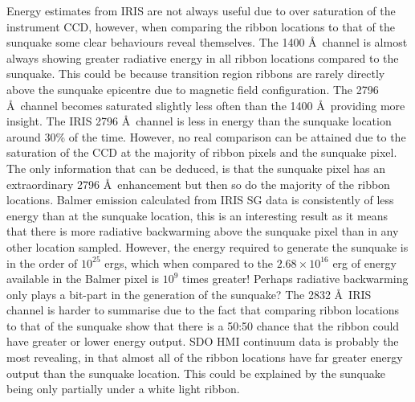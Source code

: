Energy estimates from IRIS are not always useful due to over saturation of the instrument CCD, however, when comparing the ribbon locations to that of the sunquake some clear behaviours reveal themselves. The 1400 \AA\ channel is almost always showing greater radiative energy in all ribbon locations compared to the sunquake. This could be because transition region ribbons are rarely directly above the sunquake epicentre due to magnetic field configuration. The 2796 \AA\ channel becomes saturated slightly less often than the 1400 \AA\, providing more insight. The IRIS 2796 \AA\ channel is less in energy than the sunquake location around 30\% of the time. However, no real comparison can be attained due to the saturation of the CCD at the majority of ribbon pixels and the sunquake pixel. The only information that can be deduced, is that the sunquake pixel has an extraordinary 2796 \AA\ enhancement but then so do the majority of the ribbon locations. Balmer emission calculated from IRIS SG data is consistently of less energy than at the sunquake location, this is an interesting result as it means that there is more radiative backwarming above the sunquake pixel than in any other location sampled. However, the energy required to generate the sunquake is in the order of $10^25$ ergs, which when compared to the $2.68{\times}10^{16}$ erg of energy available in the Balmer pixel is $10^{9}$ times greater! Perhaps radiative backwarming only plays a bit-part in the generation of the sunquake?  
The 2832 \AA\ IRIS channel is harder to summarise due to the fact that comparing ribbon locations to that of the sunquake show that there is a 50:50 chance that the ribbon could have greater or lower energy output.
SDO HMI continuum data is probably the most revealing, in that almost all of the ribbon locations have far greater energy output than the sunquake location. This could be explained by the sunquake being only partially under a white light ribbon. 
